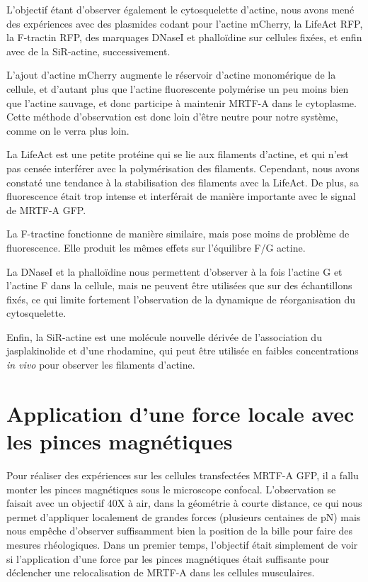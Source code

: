 L'objectif étant d'observer également le cytosquelette d'actine, nous avons mené des expériences avec des plasmides codant pour l’actine mCherry, la LifeAct RFP, la F-tractin RFP, des marquages DNaseI et phalloïdine sur cellules fixées, et enfin avec de la SiR-actine, successivement.
 
L'ajout d'actine mCherry augmente le réservoir d'actine monomérique de la cellule, et d'autant plus que l'actine fluorescente polymérise un peu moins bien que l'actine sauvage, et donc participe à maintenir MRTF-A dans le cytoplasme. 
Cette méthode d'observation est donc loin d'être neutre pour notre système, comme on le verra plus loin.
 
La LifeAct \parencite{riedl_lifeact:_2008} est une petite protéine qui se lie aux filaments d'actine, et qui n'est pas censée interférer avec la polymérisation des filaments. Cependant, nous avons constaté une tendance à la stabilisation des filaments avec la LifeAct. De plus, sa fluorescence était trop intense et interférait de manière importante avec le signal de MRTF-A GFP. 

La F-tractine \parencite{johnson_neuronal_2009} fonctionne de manière similaire, mais pose moins de problème de fluorescence. Elle produit les mêmes effets sur l'équilibre F/G actine.  

La DNaseI et la phalloïdine nous permettent d'observer à la fois l'actine G et l'actine F dans la cellule, mais ne peuvent être utilisées que sur des échantillons fixés, ce qui limite fortement l'observation de la dynamique de réorganisation du cytosquelette.
 
Enfin, la SiR-actine \parencite{lukinavicius_fluorogenic_2014} est une molécule nouvelle dérivée de l'association du jasplakinolide et d'une rhodamine, qui peut être utilisée en faibles concentrations \emph{in vivo} pour observer les filaments d'actine. 


\section{Application d'une force locale avec les pinces magnétiques}

Pour réaliser des expériences sur les cellules transfectées MRTF-A GFP, il a fallu monter les pinces magnétiques sous le microscope confocal. 
L'observation se faisait avec un objectif 40X à air, dans la géométrie à courte distance, ce qui nous permet d'appliquer localement de grandes forces (plusieurs centaines de pN) mais nous empêche d'observer suffisamment bien la position de la bille pour faire des mesures rhéologiques. 
Dans un premier temps, l'objectif était simplement de voir si l'application d'une force par les pinces magnétiques était suffisante pour déclencher une relocalisation de MRTF-A dans les cellules musculaires. 

